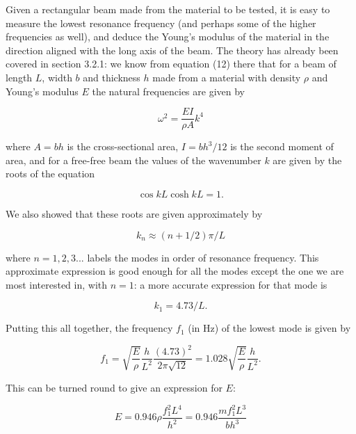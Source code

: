   Given a rectangular beam made from the material to be tested, it is easy to 
  measure the lowest resonance frequency (and perhaps some of the higher 
  frequencies as well), and deduce the Young's modulus of the material in the 
  direction aligned with the long axis of the beam. The theory has already been 
  covered in section 3.2.1: we know from equation (12) there that for a beam of 
  length $L$, width $b$ and thickness $h$ made from a material with density 
  $\rho$ and Young's modulus $E$ the natural frequencies are given by 

  \begin{equation*}\omega^2 = \dfrac{EI}{\rho A} k^4 \tag{1}\end{equation*} 

  \noindent{}where $A=bh$ is the cross-sectional area, $I=b h^3/12$ is the 
  second moment of area, and for a free-free beam the values of the wavenumber 
  $k$ are given by the roots of the equation 

  \begin{equation*}\cos kL \cosh kL =1 . \tag{2}\end{equation*} 

  We also showed that these roots are given approximately by 

  \begin{equation*}k_n \approx (n+1/2) \pi/L \tag{3}\end{equation*} 

  \noindent{}where $n=1,2,3...$ labels the modes in order of resonance 
  frequency. This approximate expression is good enough for all the modes 
  except the one we are most interested in, with $n=1$: a more accurate 
  expression for that mode is 

  \begin{equation*}k_1 = 4.73/L . \tag{4}\end{equation*} 

  Putting this all together, the frequency $f_1$ (in Hz) of the lowest mode is 
  given by 

  \begin{equation*}f_1 = \sqrt{\dfrac{E}{\rho}} \dfrac{h}{L^2} 
  \dfrac{(4.73)^2}{2 \pi \sqrt{12}} = 1.028 \sqrt{\dfrac{E}{\rho}} 
  \dfrac{h}{L^2} . \tag{5}\end{equation*} 

  This can be turned round to give an expression for $E$: 

  \begin{equation*}E=0.946 \rho \dfrac{f_1^2 L^4}{h^2}=0.946 \dfrac{m f_1^2 
  L^3}{b h^3} \tag{6}\end{equation*} 

